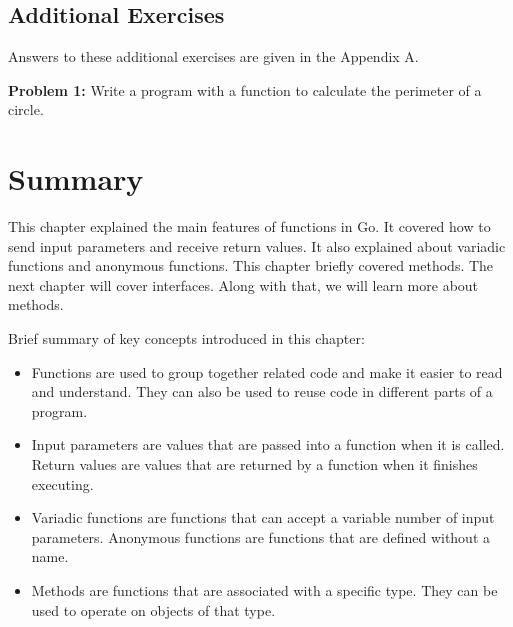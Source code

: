 \subsection{Additional Exercises}

Answers to these additional exercises are given in the Appendix A.

\textbf{Problem 1:} Write a program with a function to calculate the perimeter of a circle.

\section*{Summary}

This chapter explained the main features of functions in Go. It covered how to
send input parameters and receive return values. It also explained about
variadic functions and anonymous functions. This chapter briefly covered
methods. The next chapter will cover interfaces. Along with that, we will learn
more about methods.

Brief summary of key concepts introduced in this chapter:

\begin{itemize}

\item Functions are used to group together related code and make it easier to read and
  understand. They can also be used to reuse code in different parts of a
  program.

\item Input parameters are values that are passed into a function when it is called.
  Return values are values that are returned by a function when it finishes
  executing.

\item Variadic functions are functions that can accept a variable number of input
  parameters. Anonymous functions are functions that are defined without a name.

\item Methods are functions that are associated with a specific type. They can be used
  to operate on objects of that type.

\end{itemize}
